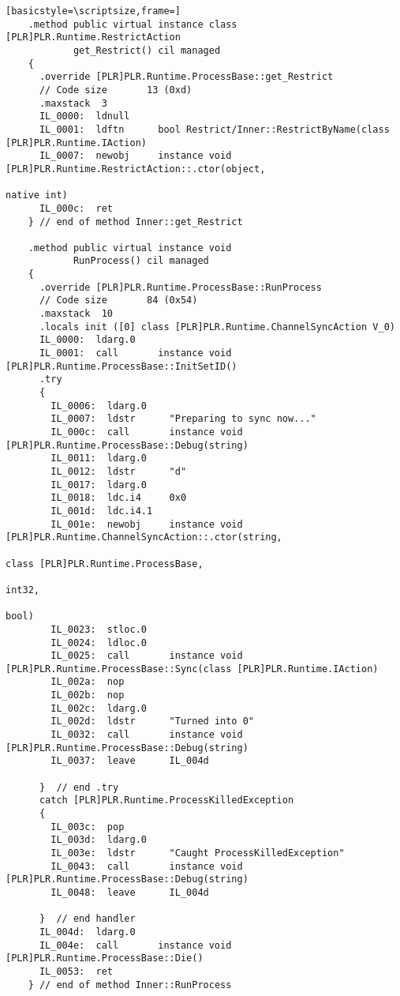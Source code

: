 \begin{lstlisting}[basicstyle=\scriptsize,frame=]
    .method public virtual instance class [PLR]PLR.Runtime.RestrictAction 
            get_Restrict() cil managed
    {
      .override [PLR]PLR.Runtime.ProcessBase::get_Restrict
      // Code size       13 (0xd)
      .maxstack  3
      IL_0000:  ldnull
      IL_0001:  ldftn      bool Restrict/Inner::RestrictByName(class [PLR]PLR.Runtime.IAction)
      IL_0007:  newobj     instance void [PLR]PLR.Runtime.RestrictAction::.ctor(object,
                                                                                native int)
      IL_000c:  ret
    } // end of method Inner::get_Restrict

    .method public virtual instance void 
            RunProcess() cil managed
    {
      .override [PLR]PLR.Runtime.ProcessBase::RunProcess
      // Code size       84 (0x54)
      .maxstack  10
      .locals init ([0] class [PLR]PLR.Runtime.ChannelSyncAction V_0)
      IL_0000:  ldarg.0
      IL_0001:  call       instance void [PLR]PLR.Runtime.ProcessBase::InitSetID()
      .try
      {
        IL_0006:  ldarg.0
        IL_0007:  ldstr      "Preparing to sync now..."
        IL_000c:  call       instance void [PLR]PLR.Runtime.ProcessBase::Debug(string)
        IL_0011:  ldarg.0
        IL_0012:  ldstr      "d"
        IL_0017:  ldarg.0
        IL_0018:  ldc.i4     0x0
        IL_001d:  ldc.i4.1
        IL_001e:  newobj     instance void [PLR]PLR.Runtime.ChannelSyncAction::.ctor(string,
                                                                                     class [PLR]PLR.Runtime.ProcessBase,
                                                                                     int32,
                                                                                     bool)
        IL_0023:  stloc.0
        IL_0024:  ldloc.0
        IL_0025:  call       instance void [PLR]PLR.Runtime.ProcessBase::Sync(class [PLR]PLR.Runtime.IAction)
        IL_002a:  nop
        IL_002b:  nop
        IL_002c:  ldarg.0
        IL_002d:  ldstr      "Turned into 0"
        IL_0032:  call       instance void [PLR]PLR.Runtime.ProcessBase::Debug(string)
        IL_0037:  leave      IL_004d

      }  // end .try
      catch [PLR]PLR.Runtime.ProcessKilledException 
      {
        IL_003c:  pop
        IL_003d:  ldarg.0
        IL_003e:  ldstr      "Caught ProcessKilledException"
        IL_0043:  call       instance void [PLR]PLR.Runtime.ProcessBase::Debug(string)
        IL_0048:  leave      IL_004d

      }  // end handler
      IL_004d:  ldarg.0
      IL_004e:  call       instance void [PLR]PLR.Runtime.ProcessBase::Die()
      IL_0053:  ret
    } // end of method Inner::RunProcess


\end{lstlisting}
